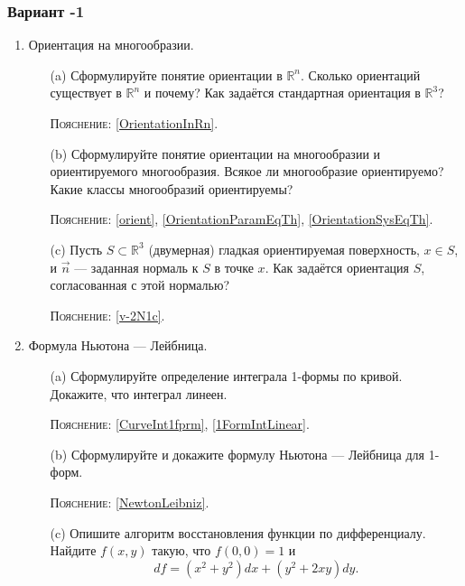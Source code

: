 \documentclass[a5paper]{article}
\theoremstyle{plain}
\theoremstyle{definition}
\numberwithin{through}{section}
\numberwithin{equation}{section}
\begin{document}
\newpage
\subsubsection{Вариант -1}

\begin{enumerate}
	\item 
	Ориентация на многообразии.
	
	\begin{itemize}
		\item[(a)]
		Сформулируйте понятие ориентации в $\mathbb{R}^n$. Сколько ориентаций
		существует в $\mathbb{R}^n$ и почему? Как задаётся стандартная ориентация в $\mathbb{R}^3$?
		
		\textsc{Пояснение:} \ref{OrientationInRn}.
		
		\item[(b)]
		Сформулируйте понятие ориентации на многообразии и ориентируемого многообразия. Всякое ли многообразие ориентируемо? Какие классы многообразий ориентируемы?
		
		\textsc{Пояснение:} \ref{orient}, \ref{OrientationParamEqTh}, \ref{OrientationSysEqTh}.
		
		
		\item[(c)]
		Пусть $S \subset \mathbb{R}^3$ (двумерная) гладкая ориентируемая поверхность,
		$x \in S$, и $\vec{n}$ --- заданная нормаль к $S$ в точке $x$. Как задаётся ориентация $S$, согласованная с этой нормалью?
		
		\textsc{Пояснение:} \ref{v-2N1c}.
		
		
	\end{itemize}
	
	\item
	Формула Ньютона — Лейбница.
	
	\begin{itemize}
		\item[(a)]
		Сформулируйте определение интеграла 1-формы по кривой.
		Докажите, что интеграл линеен.
		
		\textsc{Пояснение:} \ref{CurveInt1fprm}, \ref{1FormIntLinear}.
		
		\item[(b)]
		Сформулируйте и докажите формулу Ньютона --- Лейбница для
		1-форм.
			
		\textsc{Пояснение:} \ref{NewtonLeibniz}.
		
		\item[(c)]
		Опишите алгоритм восстановления функции по дифференциалу. Найдите $f(x, y)$ такую, что $f(0, 0) = 1$
		и 
		\[ df = (x^2 + y^2)dx + (y^2 + 2xy)dy. \]
	\end{itemize}
\end{enumerate}
\end{document}
